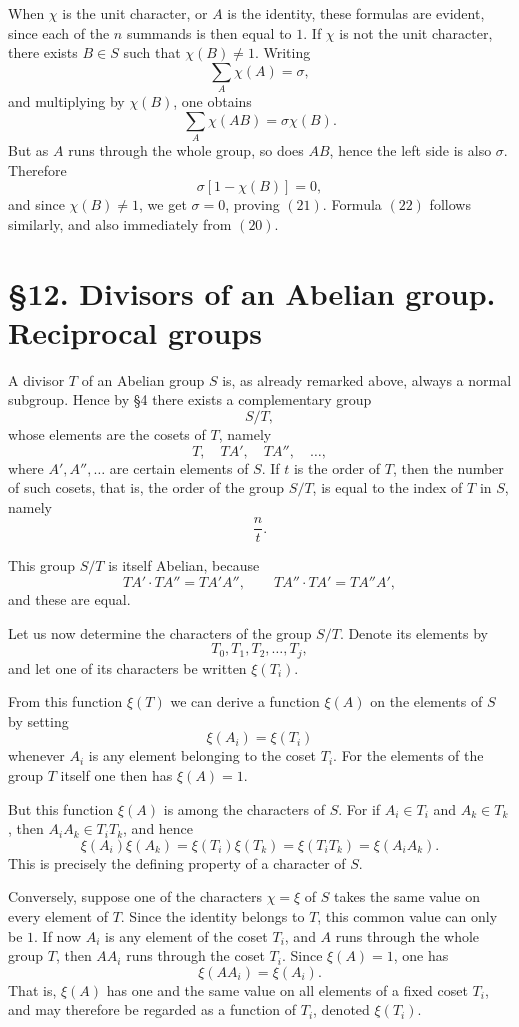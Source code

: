 \documentclass[11pt]{article}
\begin{document}
When \(\chi\) is the unit character, or \(A\) is the identity, these formulas are evident, since each of the \(n\) summands is then equal to \(1\). If \(\chi\) is not the unit character, there exists \(B\in S\) such that \(\chi(B)\neq 1\). Writing
\[
\sum_A \chi(A)=\sigma,
\]
and multiplying by \(\chi(B)\), one obtains
\[
\sum_A \chi(AB)=\sigma\chi(B).
\]
But as \(A\) runs through the whole group, so does \(AB\), hence the left side is also \(\sigma\). Therefore
\[
\sigma[1-\chi(B)]=0,
\]
and since \(\chi(B)\neq 1\), we get \(\sigma=0\), proving \((21)\). Formula \((22)\) follows similarly, and also immediately from \((20)\).

\section*{\S 12. Divisors of an Abelian group. Reciprocal groups}

A divisor \(T\) of an Abelian group \(S\) is, as already remarked above, always a normal subgroup. Hence by \S 4 there exists a complementary group
\[
S/T,
\]
whose elements are the cosets of \(T\), namely
\[
T,\quad TA',\quad TA'',\quad \dots,
\tag{1}
\]
where \(A',A'',\dots\) are certain elements of \(S\). If \(t\) is the order of \(T\), then the number of such cosets, that is, the order of the group \(S/T\), is equal to the index of \(T\) in \(S\), namely
\[
\frac{n}{t}.
\]

This group \(S/T\) is itself Abelian, because
\[
TA'\cdot TA'' = TA'A'',
\qquad
TA''\cdot TA' = TA''A',
\]
and these are equal.

Let us now determine the characters of the group \(S/T\). Denote its elements by
\[
T_0,T_1,T_2,\dots,T_j,
\tag{2}
\]
and let one of its characters be written \(\xi(T_i)\).

From this function \(\xi(T)\) we can derive a function \(\xi(A)\) on the elements of \(S\) by setting
\[
\xi(A_i)=\xi(T_i)
\tag{3}
\]
whenever \(A_i\) is any element belonging to the coset \(T_i\). For the elements of the group \(T\) itself one then has \(\xi(A)=1\).

But this function \(\xi(A)\) is among the characters of \(S\). For if \(A_i\in T_i\) and \(A_k\in T_k\), then \(A_iA_k\in T_iT_k\), and hence
\[
\xi(A_i)\xi(A_k)=\xi(T_i)\xi(T_k)=\xi(T_iT_k)=\xi(A_iA_k).
\tag{4}
\]
This is precisely the defining property of a character of \(S\).

Conversely, suppose one of the characters \(\chi=\xi\) of \(S\) takes the same value on every element of \(T\). Since the identity belongs to \(T\), this common value can only be \(1\). If now \(A_i\) is any element of the coset \(T_i\), and \(A\) runs through the whole group \(T\), then \(AA_i\) runs through the coset \(T_i\). Since \(\xi(A)=1\), one has
\[
\xi(AA_i)=\xi(A_i).
\tag{5}
\]
That is, \(\xi(A)\) has one and the same value on all elements of a fixed coset \(T_i\), and may therefore be regarded as a function of \(T_i\), denoted \(\xi(T_i)\).
\end{document}
